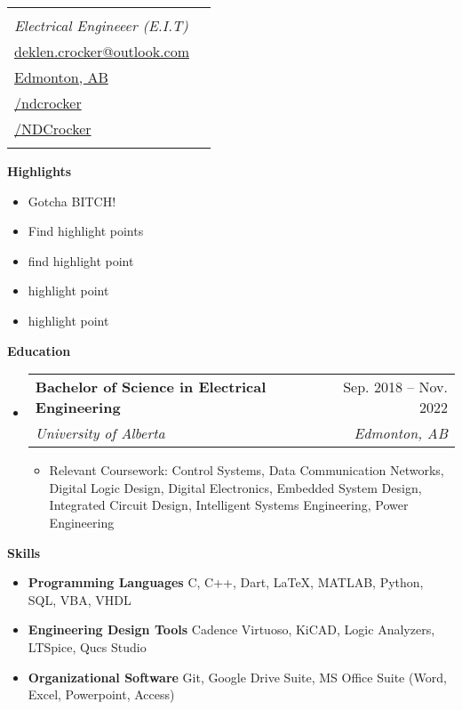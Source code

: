\documentclass[letterpaper,12pt]{article}[leftmargin=*]
\makeatletter
\def \fullname {Nicolas Deklen Crocker}
\def \subtitle {Electrical Engineeer (E.I.T)}
\def \linkedinicon {\faLinkedin}
\def \linkedinlink {https://linkedin.com/in/ndcrocker/}
\def \linkedintext {/ndcrocker}
\def \phoneicon {\faPhone}
\def \phonetext {+1 (825) 333-4907}
\def \emailicon {\faEnvelope}
\def \emaillink {mailto:deklen.crocker@outlook.com}
\def \emailtext {deklen.crocker@outlook.com}
\def \githubicon {\faGithub}
\def \githublink {https://github.com/NDCrocker}
\def \githubtext {/NDCrocker}
\def \addyicon {\faHome}
\def \addylink {https://goo.gl/maps/KHCJbwCxgCt38gPK7} %
\def \addytext {Edmonton, AB}
\def \headertype {\singlecol} %
\def \entryspacing {-0pt}
\def \linkedin {\linkedinicon \hspace{3pt}\href{\linkedinlink}{\linkedintext}}
\def \phone {\phoneicon \hspace{3pt}{ \phonetext}}
\def \email {\emailicon \hspace{3pt}\href{\emaillink}{\emailtext}}
\def \github {\githubicon \hspace{3pt}\href{\githublink}{\githubtext}}
\def \addy {\addyicon \hspace{3pt}\href{\addylink}{\addytext}}
\renewcommand{\section}[2]{\vspace{5pt}
  \colorbox{secondary}{\color{white}\raggedbottom\normalsize\textbf{{#1}{\hspace{7pt}#2}}}
}
\newcommand{\resumeEntryStart}{\begin{itemize}[leftmargin=2.5mm]}
\newcommand{\resumeEntryEnd}{\end{itemize}\vspace{\entryspacing}}
\newcommand{\resumeItemListStart}{\begin{itemize}[leftmargin=4.5mm]}
\newcommand{\resumeItemListEnd}{\end{itemize}}
\newcommand{\resumeItem}[1]{
  \item\small{
    {#1 \vspace{-2pt}}
  }
}
\newcommand{\resumeEntryTSDL}[4]{
  \vspace{-1pt}\item[]
    \begin{tabularx}{0.97\textwidth}{X@{\hspace{60pt}}r}
      \textbf{\color{primary}#1} & {\firabook\color{accent}\small#2} \\
      \textit{\color{accent}\small#3} & \textit{\color{accent}\small#4} \\
    \end{tabularx}\vspace{-6pt}
}
\newcommand{\resumeEntryS}[2]{
  \item[]\small{
    \textbf{\color{primary}#1 }{ #2 \vspace{-6pt}}
  }
}
\newcommand{\doublecol}[6]{
  \begin{tabularx}{\textwidth}{Xr}
    {
      \begin{tabular}[c]{l}
        \fontsize{35}{45}\selectfont{\color{primary}{{\textbf{\fullname}}}} \\
        {\textit{\subtitle}} %
      \end{tabular}
    } & {
      \begin{tabular}[c]{l@{\hspace{1.5em}}l}
        {\small#4} & {\small#1} \\
        {\small#5} & {\small#2} \\
        {\small#6} & {\small#3}
      \end{tabular}
    }
  \end{tabularx}
}
\newcommand{\singlecol}[6]{
  \begin{tabularx}{\textwidth}{Xr}
    {
      \begin{tabular}[b]{l}
        \fontsize{35}{45}\selectfont{\color{primary}{{\textbf{\fullname}}}} \\
        {\textit{\subtitle}} %
      \end{tabular}
    } & {
      \begin{tabular}[c]{l}
        {\small#1} \\
        {\small#2} \\
        {\small#3} \\
        {\small#4} \\
        {\small#5} \\
        {\small#6}
      \end{tabular}
    }
  \end{tabularx}
}
\makeatother
\begin{document}


\headertype{\phone}{\email}{\addy}{\linkedin}{\github}{} %
\vspace{-20pt} %

\section{}{Highlights}
  \resumeItemListStart
    \resumeItem{Gotcha BITCH!}
    \resumeItem{Find highlight points}
    \resumeItem{find highlight point}
    \resumeItem{highlight point}
    \resumeItem{highlight point}
  \resumeItemListEnd
\section{\faGraduationCap}{Education}

  \resumeEntryStart
    \resumeEntryTSDL
      {Bachelor of Science in Electrical Engineering}{Sep. 2018 -- Nov. 2022}
      {University of Alberta}{Edmonton, AB}
  \resumeItemListStart
    \resumeItem{Relevant Coursework: Control Systems, Data Communication Networks, Digital Logic Design, Digital Electronics, Embedded System Design, Integrated Circuit Design, Intelligent Systems Engineering, Power Engineering}
  \resumeItemListEnd
  \resumeEntryEnd

\section{\faGears}{Skills}

  \resumeEntryStart
   \resumeEntryS{Programming Languages } {C, C++, Dart, LaTeX, MATLAB, Python, SQL, VBA, VHDL}
   \resumeEntryS{Engineering Design Tools } {Cadence Virtuoso, KiCAD, Logic Analyzers, LTSpice, Qucs Studio}
   \resumeEntryS{Organizational Software } {Git, Google Drive Suite, MS Office Suite (Word, Excel, Powerpoint, Access)}
  \resumeEntryEnd
\end{document}
